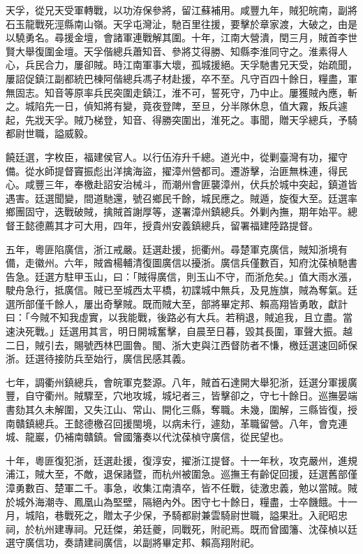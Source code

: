 \begin{pinyinscope}
天孚，從兄天受軍轉戰，以功洊保參將，留江蘇補用。咸豐九年，賊犯皖南，副將石玉龍戰死涇縣南山嶺。天孚屯灣沚，馳百里往援，要擊於章家渡，大破之，由是以驍勇名。尋援金壇，會諸軍連戰解其圍。十年，江南大營潰，閏三月，賊首李世賢大舉復圍金壇。天孚偕總兵蕭知音、參將艾得勝、知縣李淮同守之。淮素得人心，兵民合力，屢卻賊。時江南軍事大壞，孤城援絕。天孚馳書兄天受，始疏聞，屢詔促鎮江副都統巴棟阿偕總兵馮子材赴援，卒不至。凡守百四十餘日，糧盡，軍無固志。知音等原率兵民突圍走鎮江，淮不可，誓死守，乃中止。屢獲賊內應，斬之。城陷先一日，偵知將有變，竟夜登陴，至旦，分半隊休息，值大霧，叛兵遽起，先戕天孚。賊乃梯登，知音、得勝突圍出，淮死之。事聞，贈天孚總兵，予騎都尉世職，謚威毅。

饒廷選，字枚臣，福建侯官人。以行伍洊升千總。道光中，從剿臺灣有功，擢守備。從水師提督竇振彪出洋擒海盜，擢漳州營都司。遷游擊，治匪無株連，得民心。咸豐三年，奉檄赴詔安治械斗，而潮州會匪襲漳州，伏兵於城中突起，鎮道皆遇害。廷選聞變，間道馳還，號召鄉民千餘，城民應之。賊遁，旋復大至。廷選率鄉團固守，迭戰破賊，擒賊首謝厚等，遂署漳州鎮總兵。外剿內撫，期年始平。總督王懿德薦其才可大用，四年，授貴州安義鎮總兵，留署福建陸路提督。

五年，粵匪陷廣信，浙江戒嚴。廷選赴援，扼衢州。尋楚軍克廣信，賊知浙境有備，走徽州。六年，賊酋楊輔清復圖廣信以擾浙。廣信兵僅數百，知府沈葆楨馳書告急。廷選方駐甲玉山，曰：「賊得廣信，則玉山不守，而浙危矣。」值大雨水漲，駛舟急行，抵廣信。賊已至城西太平橋，初諜城中無兵，及見旌旗，賊為奪氣。廷選所部僅千餘人，屢出奇擊賊。既而賊大至，部將畢定邦、賴高翔皆勇敢，獻計曰：「今賊不知我虛實，以我能戰，後路必有大兵。若稍退，賊追我，且立盡。當速決死戰。」廷選用其言，明日開城奮擊，自晨至日暮，毀其長圍，軍聲大振。越二日，賊引去，賜號西林巴圖魯。閩、浙大吏與江西督防者不慊，檄廷選速回師保浙。廷選待接防兵至始行，廣信民感其義。

七年，調衢州鎮總兵，會皖軍克婺源。八年，賊首石達開大舉犯浙，廷選分軍援廣豐，自守衢州。賊驟至，穴地攻城，城圮者三，皆擊卻之，守七十餘日。巡撫晏端書劾其久未解圍，又失江山、常山、開化三縣，奪職。未幾，圍解，三縣皆復，授南贛鎮總兵。王懿德檄召回援閩境，以病未行，遽劾，革職留營。八年，會克連城、龍巖，仍補南贛鎮。曾國籓奏以代沈葆楨守廣信，從民望也。

十年，粵匪復犯浙，廷選赴援，復淳安，擢浙江提督。十一年秋，攻克嚴州，進規浦江，賊大至，不敵，退保諸暨，而杭州被圍急。巡撫王有齡促回援，廷選舊部僅漳勇數百、楚軍二千。事急，收集江南潰卒，皆不任戰，徒激忠義，勉以當賊。賊於城外海潮寺、鳳凰山為堅壁，隔絕內外。困守七十餘日，糧盡，士卒饑餓。十一月，城陷，巷戰死之，贈太子少保，予騎都尉兼雲騎尉世職，謚果壯。入祀昭忠祠，於杭州建專祠。兄廷傑，弟廷夔，同戰死，附祀焉。既而曾國籓、沈葆楨以廷選守廣信功，奏請建祠廣信，以副將畢定邦、賴高翔附祀。


\end{pinyinscope}
